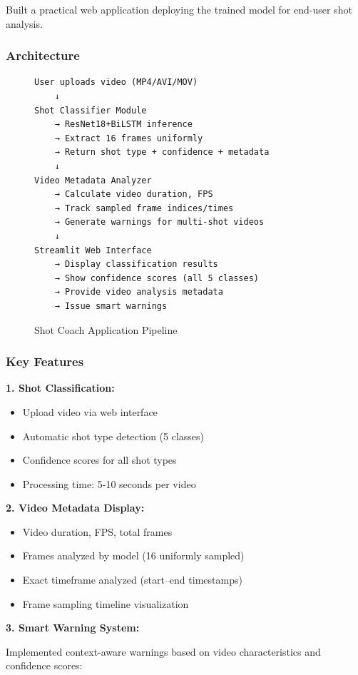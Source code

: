 \documentclass[12pt,a4paper]{article}
\begin{document}
Built a practical web application deploying the trained model for end-user shot analysis.

\subsubsection{Architecture}

\begin{figure}[H]
\centering
\begin{verbatim}
User uploads video (MP4/AVI/MOV)
    ↓
Shot Classifier Module
    → ResNet18+BiLSTM inference
    → Extract 16 frames uniformly
    → Return shot type + confidence + metadata
    ↓
Video Metadata Analyzer
    → Calculate video duration, FPS
    → Track sampled frame indices/times
    → Generate warnings for multi-shot videos
    ↓
Streamlit Web Interface
    → Display classification results
    → Show confidence scores (all 5 classes)
    → Provide video analysis metadata
    → Issue smart warnings
\end{verbatim}
\caption{Shot Coach Application Pipeline}
\end{figure}

\subsubsection{Key Features}

\textbf{1. Shot Classification:}
\begin{itemize}
\item Upload video via web interface
\item Automatic shot type detection (5 classes)
\item Confidence scores for all shot types
\item Processing time: 5-10 seconds per video
\end{itemize}

\textbf{2. Video Metadata Display:}
\begin{itemize}
\item Video duration, FPS, total frames
\item Frames analyzed by model (16 uniformly sampled)
\item Exact timeframe analyzed (start--end timestamps)
\item Frame sampling timeline visualization
\end{itemize}

\textbf{3. Smart Warning System:}

Implemented context-aware warnings based on video characteristics and confidence scores:
\end{document}
